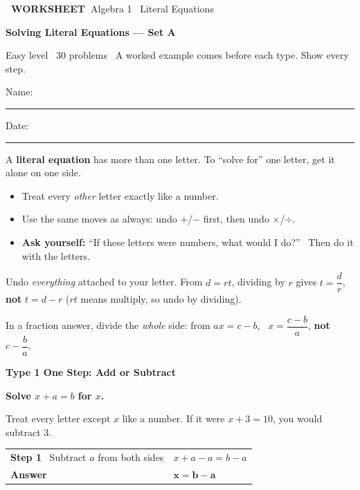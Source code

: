 \documentclass[11pt,letterpaper]{article}
\newcommand{\badge}[1]{\colorbox{fmtitle}{\color{white}\bfseries\small\ #1\ }}
\newcommand{\topicbar}[1]{\needspace{4.5cm}\par\vspace{5mm}
  \begin{tcolorbox}[enhanced,colback=fmtitle,colframe=fmtitle,arc=2mm,left=4mm,top=1.5mm,bottom=1.5mm]
  \color{white}\bfseries\large #1
  \end{tcolorbox}}
\begin{document}
\badge{WORKSHEET}\hfill{\small\color{fmgray}Algebra 1 \textperiodcentered\ Literal Equations}\par\vspace{4mm}
{\color{fmtitle}\LARGE\bfseries Solving Literal Equations --- Set A}\par\vspace{1mm}
{\color{fmgray}Easy level \textperiodcentered\ 30 problems \textperiodcentered\ A worked example comes before each type. Show every step.}\par\vspace{3mm}
Name: \rule{6cm}{0.4pt}\hspace{1cm}Date: \rule{3.5cm}{0.4pt}\par\vspace{1mm}
\begin{keyidea}A \textbf{literal equation} has more than one letter. To ``solve for'' one letter, get it alone on one side.
\begin{itemize}[itemsep=1pt,topsep=2pt]
\item Treat every \emph{other} letter exactly like a number.
\item Use the same moves as always: undo $+$/$-$ first, then undo $\times$/$\div$.
\item \textbf{Ask yourself:} ``If these letters were numbers, what would I do?'' \ Then do it with the letters.
\end{itemize}\end{keyidea}
\begin{mistakebox}Undo \emph{everything} attached to your letter. From $d = rt$, dividing by $r$ gives $t = \dfrac{d}{r}$, \textbf{not} $t = d - r$ ($rt$ means multiply, so undo by dividing).\par
In a fraction answer, divide the \emph{whole} side: from $ax = c - b$, \ $x = \dfrac{c - b}{a}$, \textbf{not} $c - \dfrac{b}{a}$.\end{mistakebox}
\needspace{9cm}\topicbar{Type 1 \quad One Step: Add or Subtract}
\begin{watchme}\textbf{Solve $x + a = b$ for $x$.}\par\vspace{1mm}
Treat every letter except $x$ like a number. If it were $x + 3 = 10$, you would subtract 3.\par\vspace{1mm}
\renewcommand{\arraystretch}{2.1}\begin{tabular}{@{}l l@{}}
\textbf{Step 1} \ Subtract $a$ from both sides & $x + a - a = b - a$\\
\textbf{Answer} & $\boldsymbol{x = b - a}$
\end{tabular}\end{watchme}
\end{document}
